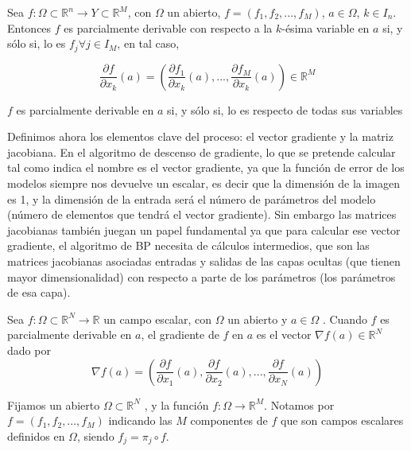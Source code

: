 \begin{definicion}
        Sea $f: \Omega \subset \mathbb{R}^n \rightarrow Y \subset \mathbb{R}^M$, con $\Omega$ un abierto, $f=(f_1, f_2, ..., f_M)$, $a \in \Omega$, $k \in I_n$. Entonces $f$ es parcialmente derivable con respecto a la $k$-ésima variable en $a$ si, y sólo si, lo es $f_j \forall j \in I_M$, en tal caso, 

        $$\frac{\partial f}{\partial x_k}(a) = \left ( \frac{\partial f_1}{\partial x_k}(a), ..., \frac{\partial f_M}{\partial x_k}(a) \right ) \in \mathbb{R}^M$$

        $f$ es parcialmente derivable en $a$ si, y sólo si, lo es respecto de todas sus variables
\end{definicion}


Definimos ahora los elementos clave del proceso: el vector gradiente y la matriz jacobiana. En el algoritmo de descenso de gradiente, lo que se pretende calcular tal como indica el nombre es el vector gradiente, ya que la función de error de los modelos siempre nos devuelve un escalar, es decir que la dimensión de la imagen es 1, y la dimensión de la entrada será el número de parámetros del modelo (número de elementos que tendrá el vector gradiente). Sin embargo las matrices jacobianas también juegan un papel fundamental ya que para calcular ese vector gradiente, el algoritmo de BP necesita de cálculos intermedios, que son las matrices jacobianas asociadas entradas y salidas de las capas ocultas (que tienen mayor dimensionalidad) con respecto a parte de los parámetros (los parámetros de esa capa). 

\begin{definicion}
    Sea $f:\Omega \subset \mathbb{R}^N \rightarrow \mathbb{R}$ un campo escalar, con $\Omega$ un abierto y $a \in \Omega$ . Cuando $f$ es parcialmente derivable en $a$, el gradiente de $f$ en $a$ es el vector $\nabla f(a) \in \mathbb{R}^N$ dado por 
    $$\nabla f(a) = \left ( \frac{\partial f}{\partial x_1} (a), \frac{\partial f}{\partial x_2} (a), ..., \frac{\partial f}{\partial x_N} (a) \right )$$
\end{definicion}


Fijamos un abierto $\Omega \subset \mathbb{R}^N$
, y la función $f:\Omega \rightarrow \mathbb{R}^M$. Notamos por $f= \left ( f_1,f_2,..., f_M \right )$ indicando las $M$ componentes de $f$ que son campos escalares definidos en $\Omega$, siendo $f_j=\pi _j \circ f$.


